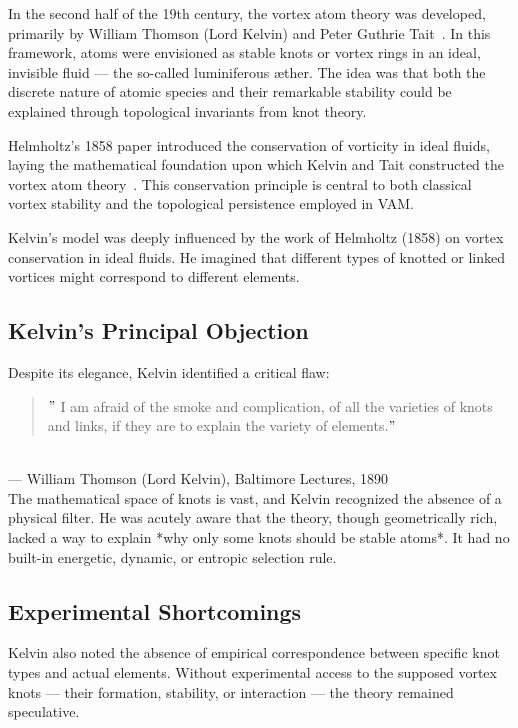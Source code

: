\documentclass[preprint,notitlepage]{revtex4-2}
\begin{document}
    In the second half of the 19th century, the vortex atom theory was developed, primarily by William Thomson (Lord Kelvin) and Peter Guthrie Tait~\cite{thomson1890knots, tait1877knots}. In this framework, atoms were envisioned as stable knots or vortex rings in an ideal, invisible fluid — the so-called luminiferous æther. The idea was that both the discrete nature of atomic species and their remarkable stability could be explained through topological invariants from knot theory.

    Helmholtz's 1858 paper introduced the conservation of vorticity in ideal fluids, laying the mathematical foundation upon which Kelvin and Tait constructed the vortex atom theory~\cite{helmholtz1858vortices}. This conservation principle is central to both classical vortex stability and the topological persistence employed in VAM.

    Kelvin's model was deeply influenced by the work of Helmholtz (1858) on vortex conservation in ideal fluids. He imagined that different types of knotted or linked vortices might correspond to different elements.

    \subsection*{Kelvin's Principal Objection}

    Despite its elegance, Kelvin identified a critical flaw:

    \begin{quote}
    \("\) I am afraid of the smoke and complication, of all the varieties of knots and links, if they are to explain the variety of elements.\("\)
    \end{quote}\\
     \hfill — William Thomson (Lord Kelvin), Baltimore Lectures, 1890\\
    The mathematical space of knots is vast, and Kelvin recognized the absence of a physical filter. He was acutely aware that the theory, though geometrically rich, lacked a way to explain *why only some knots should be stable atoms*. It had no built-in energetic, dynamic, or entropic selection rule.

    \subsection*{Experimental Shortcomings}

    Kelvin also noted the absence of empirical correspondence between specific knot types and actual elements. Without experimental access to the supposed vortex knots — their formation, stability, or interaction — the theory remained speculative.
\end{document}
